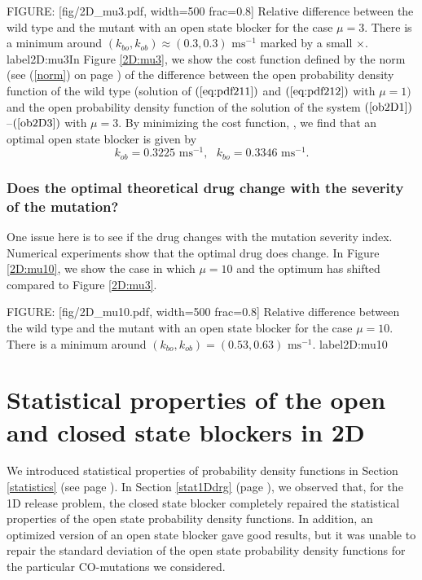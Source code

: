 {FIGURE: [fig/2D_mu3.pdf, width=500 frac=0.8] Relative difference  between the wild type and the mutant with 
an open state blocker for the case $\mu=3$. There is a minimum around $(k_{bo},k_{ob})\approx(0.3,0.3)\text{ ms}^{-1}$ marked by a small $\times$. label{2D:mu3}In Figure \ref{2D:mu3}, we show the cost function defined by the norm (see
(\ref{norm}) on page \pageref{norm}) of the difference between the open probability density function of
the wild type (solution of $(\ref{eq:pdf211})$ and $(\ref{eq:pdf212})$ with $\mu=1)$
and the open probability density function of the solution of the system 
$(\ref{ob2D1})$--$(\ref{ob2D3})$ with $\mu=3.$ By minimizing the cost function,
,
we find that an optimal open state blocker is given by
\begin{equation}
k_{ob}=0.3225\text{ ms}^{-1}, \text{  } k_{bo}=0.3346\text{ ms}^{-1}. \label{optob2D}
\end{equation}

\subsubsection{Does the optimal theoretical drug change with the severity of the mutation?}
\label{optimaltheodrug}
One issue here is to see if the drug changes with the mutation severity
index. Numerical experiments show that 
the optimal drug does change. In Figure \ref{2D:mu10}, we show the case in which $\mu=10$ and the optimum has shifted compared to  Figure \ref{2D:mu3}.

FIGURE: [fig/2D_mu10.pdf, width=500 frac=0.8] Relative difference between the wild type and the mutant with 
an open state blocker for the case $\mu=10$. There is a minimum around $(k_{bo},k_{ob})=(0.53,0.63)\text{ ms}^{-1}$. label{2D:mu10}
\section[Statistical properties of blockers in 2D]{Statistical properties of the open and closed state blockers in 2D}

We introduced statistical properties of probability density functions in Section \ref{statistics} (see page \pageref{statistics}). In Section \ref{stat1Ddrg} (page \pageref{stat1Ddrg}), we observed that, for the 1D release problem, the closed state blocker completely repaired the statistical properties of the open state probability density functions. In addition, an optimized version of an open state blocker gave good results, but it was unable to repair the standard deviation of the open state probability density functions
for the particular CO-mutations we considered.

}
